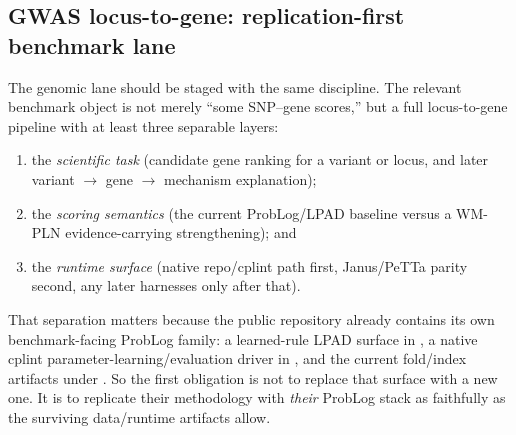 \documentclass[11pt,openany]{report}
\begin{document}
\subsection{GWAS locus-to-gene: replication-first benchmark lane}

The genomic lane should be staged with the same discipline.  The relevant
benchmark object is not merely ``some SNP--gene scores,'' but a full
locus-to-gene pipeline with at least three separable layers:
\begin{enumerate}
\item the \emph{scientific task} (candidate gene ranking for a variant or
  locus, and later variant $\to$ gene $\to$ mechanism explanation);
\item the \emph{scoring semantics} (the current ProbLog/LPAD baseline versus a
  WM-PLN evidence-carrying strengthening); and
\item the \emph{runtime surface} (native repo/cplint path first, Janus/PeTTa
  parity second, any later harnesses only after that).
\end{enumerate}
That separation matters because the public
 repository already contains its own
benchmark-facing ProbLog family: a learned-rule LPAD surface in
, a native cplint parameter-learning/evaluation
driver in , and the current fold/index artifacts
under .  So the first obligation is not to replace that
surface with a new one.  It is to replicate their methodology with
\emph{their} ProbLog stack as faithfully as the surviving data/runtime
artifacts allow.
\end{document}
